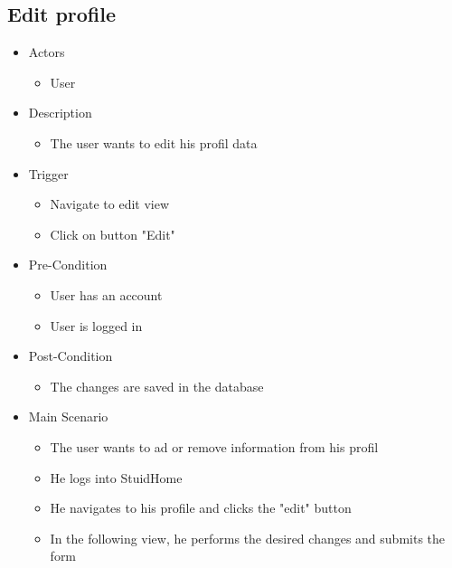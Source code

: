\documentclass[a4paper,11pt]{article}
\begin{document}
\subsection*{Edit profile}
\begin{itemize}
	\item Actors
		\begin{itemize}
			\item User
		\end{itemize}
	\item Description
		\begin{itemize}
			\item The user wants to edit his profil data
		\end{itemize}
	\item Trigger
		\begin{itemize}
			\item Navigate to edit view
			\item Click on button "Edit"
		\end{itemize}
	\item Pre-Condition
		\begin{itemize}
			\item User has an account
			\item User is logged in
		\end{itemize}
	\item Post-Condition
		\begin{itemize}
			\item The changes are saved in the database
		\end{itemize}
	\item Main Scenario
		\begin{itemize}
			\item The user wants to ad or remove information from his profil
			\item He logs into StuidHome 
			\item He navigates to his profile and clicks the "edit" button
			\item In the following view, he performs the desired changes and submits the form
		\end{itemize}
\end{itemize}
\end{document}
